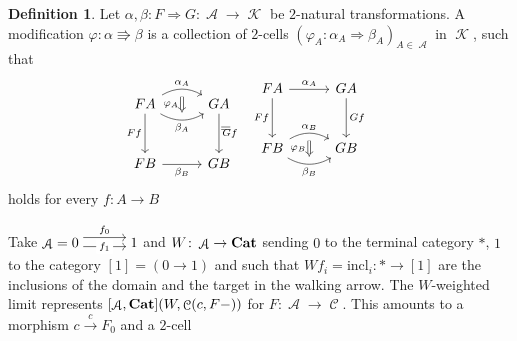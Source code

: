\documentclass[a4paper,11pt,oneside,openany]{scrbook}
\newcommand{\catname}[1]{{\normalfont\textbf{#1}}}
\newcommand{\Cat}{\catname{Cat}}
\newcommand{\from}{\colon}
\DeclareMathOperator{\K}{\mathcal{K}}
\DeclareMathOperator{\A}{\mathcal{A}}
\DeclareMathOperator{\C}{\mathcal{C}}
\theoremstyle{definition}
\theoremstyle{definition}
\newtheorem{defn}[thm]{Definition} %
\begin{document}
\begin{defn}
   Let $\alpha,\beta\colon F\Rightarrow G\colon\A\to\K$ be $2$-natural transformations. A modification $\varphi\from\alpha\Rrightarrow\beta$ is a collection of $2$-cells $(\varphi_A\colon\alpha_A\Rightarrow\beta_A)_{A\in\A}$ in $\K$, such that 
   \[
    \begin{minipage}{0.3\linewidth}
        \begin{tikzcd}[row sep=1cm, column sep=1cm]
           FA\arrow[d, "Ff"'] \arrow[r, bend right, "\beta_A"', ""{name=D, anchor=center}] \arrow[r, bend left,"\alpha_A", ""{name=U, anchor=center}] & GA \arrow[d, "Gf"] \\
 FB\arrow[r, "\beta_B"']            &GB      
      \ar[Rightarrow, shorten <= .3em, shorten >= .3em, "\varphi_A"', from=U, to=D]
 \end{tikzcd}
    \end{minipage}
    \hspace{-1.3cm}
            =
	\hspace{.4cm}
	\begin{minipage}{0.3\linewidth}
		\begin{tikzcd}[row sep=1cm, column sep=1cm]
 FA\arrow[d,"Ff"'] \arrow[r, "\alpha_A"]                        &  GA\arrow[d,"Gf"] \\
 FB\arrow[r, bend right, "\beta_B"', ""{name=D, anchor=center}] \arrow[r, bend left,"\alpha_B", ""{name=U, anchor=center}] &    GB    
 \ar[Rightarrow, shorten <= .3em, shorten >= .3em, "\varphi_B"', from=U, to=D]
		\end{tikzcd}
	\end{minipage}
    \]
   holds for every $f\from A\to B$
\end{defn}
Take $\A=\hspace{-1.5mm}\begin{tikzcd}[row sep=1cm, column sep=1.3cm]
		0\hspace{-1.5mm}\arrow[r, "f_1" description,  shift right=.5ex, shorten <= .3em, shorten >= .3em]  \arrow[r, "f_0", shift left=1ex, shorten <= .3em, shorten >= .3em] & \hspace{-1.5mm}1
		\end{tikzcd}\hspace{-1.5mm}$ and $W\from\A\to\Cat$ sending $0$ to the terminal category $*$, $1$ to the category $[1]=(0\to 1)$ and such that $Wf_i=\text{incl}_i\from *\to[1]$ are the inclusions of the domain and the target in the walking arrow. The $W$-weighted limit represents $[\A,\Cat](W,\C(c,F-))$ for $F\from\A\to\C$. This amounts to a morphism $c\xrightarrow{c}F_0$ and a $2$-cell 
\end{document}
